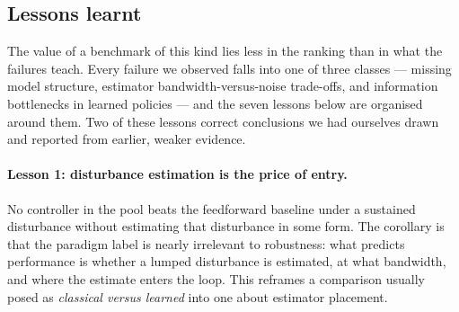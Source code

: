 
\subsection{Lessons learnt}
\label{sec:results:lessons}

The value of a benchmark of this kind lies less in the ranking than in what the failures
teach. Every failure we observed falls into one of three classes --- missing model
structure, estimator bandwidth-versus-noise trade-offs, and information bottlenecks in
learned policies --- and the seven lessons below are organised around them. Two of these
lessons correct conclusions we had ourselves drawn and reported from earlier, weaker
evidence.

\paragraph{Lesson 1: disturbance estimation is the price of entry.}
No controller in the pool beats the feedforward baseline under a sustained disturbance
without estimating that disturbance in some form. The corollary is that the paradigm
label is nearly irrelevant to robustness: what predicts performance is whether a lumped
disturbance is estimated, at what bandwidth, and where the estimate enters the loop.
This reframes a comparison usually posed as \emph{classical versus learned} into one
about estimator placement.

